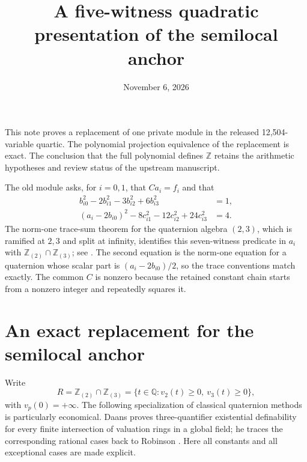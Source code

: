 \documentclass[11pt]{article}
\title{A five-witness quadratic presentation of the semilocal anchor}
\author{}
\date{November 6, 2026}
\begin{document}
\maketitle
\noindent
This note proves a replacement of one private module in the released
12,504-variable quartic. The polynomial projection equivalence of the
replacement is exact. The conclusion that the full polynomial defines
$\mathbb Z$ retains the arithmetic hypotheses and review status of the
upstream manuscript.

The old module asks, for $i=0,1$, that $Ca_i=f_i$ and that
\begin{align*}
 b_{i0}^2-2b_{i1}^2-3b_{i2}^2+6b_{i3}^2&=1,\\
 (a_i-2b_{i0})^2-8c_{i1}^2-12c_{i2}^2+24c_{i3}^2&=4.
\end{align*}
The norm-one trace-sum theorem for the quaternion algebra $(2,3)$,
which is ramified at $2,3$ and split at infinity, identifies this
seven-witness predicate in $a_i$ with
$\mathbb Z_{(2)}\cap\mathbb Z_{(3)}$; see
\cite[Proposition 6]{Koenigsmann2016}.
The second equation is the norm-one equation for a quaternion whose
scalar part is $(a_i-2b_{i0})/2$, so the trace conventions match exactly.
The common $C$ is nonzero because the retained constant chain starts
from a nonzero integer and repeatedly squares it.
\section{An exact replacement for the semilocal anchor}

Write
\[
 R=\mathbb Z_{(2)}\cap\mathbb Z_{(3)}
   =\{t\in\mathbb Q:v_2(t)\ge0,\ v_3(t)\ge0\},
\]
with $v_p(0)=+\infty$. The following specialization of classical
quaternion methods is particularly economical. Daans proves three-quantifier
existential definability for every finite intersection of valuation rings
in a global field; he traces the corresponding rational cases back to
Robinson \cite[Proposition 4.2 and Remark 4.3]{Daans2024}.
Here all constants and all exceptional cases are made explicit.
\end{document}
